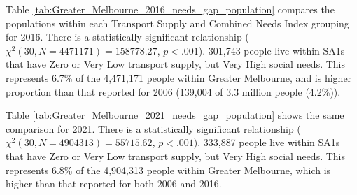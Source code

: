 \documentclass[preprint, 3p,
authoryear]{elsarticle} %
\begin{document}
Table \ref{tab:Greater_Melbourne_2016_needs_gap_population} compares the
populations within each Transport Supply and Combined Needs Index
grouping for 2016. There is a statistically significant relationship
(\(\chi^2(30, N = 4471171) = 158778.27\), \(p < .001\)). 301,743 people
live within SA1s that have Zero or Very Low transport supply, but Very
High social needs. This represents 6.7\% of the 4,471,171 people within
Greater Melbourne, and is higher proportion than that reported for 2006
(139,004 of 3.3 million people (4.2\%)).

Table \ref{tab:Greater_Melbourne_2021_needs_gap_population} shows the
same comparison for 2021. There is a statistically significant
relationship (\(\chi^2(30, N = 4904313) = 55715.62\), \(p < .001\)).
333,887 people live within SA1s that have Zero or Very Low transport
supply, but Very High social needs. This represents 6.8\% of the
4,904,313 people within Greater Melbourne, which is higher than that
reported for both 2006 and 2016.
\end{document}
